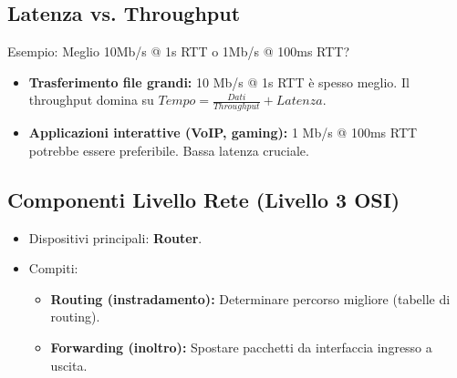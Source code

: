 \subsection{Latenza vs. Throughput}
Esempio: Meglio 10Mb/s @ 1s RTT o 1Mb/s @ 100ms RTT?
\begin{itemize}
    \item \textbf{Trasferimento file grandi:} 10 Mb/s @ 1s RTT è spesso meglio. Il throughput domina su $Tempo = \frac{Dati}{Throughput} + Latenza$.
    \item \textbf{Applicazioni interattive (VoIP, gaming):} 1 Mb/s @ 100ms RTT potrebbe essere preferibile. Bassa latenza cruciale.
\end{itemize}

\subsection{Componenti Livello Rete (Livello 3 OSI)}
\begin{itemize}
    \item Dispositivi principali: \textbf{Router}.
    \item Compiti:
    \begin{itemize}
        \item \textbf{Routing (instradamento):} Determinare percorso migliore (tabelle di routing).
        \item \textbf{Forwarding (inoltro):} Spostare pacchetti da interfaccia ingresso a uscita.
    \end{itemize}
\end{itemize}

